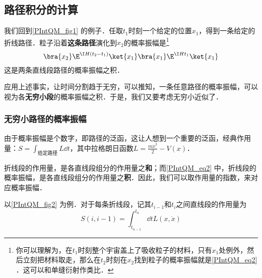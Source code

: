 \subsection{路径积分的计算}

我们回到\autoref{PIntQM_fig1} 的例子．任取$t_1$时刻一个给定的位置$x_1$，得到一条给定的折线路径．粒子沿着\textbf{这条路径}演化到$x_2$的概率振幅是\footnote{你可以理解为，在$t_1$时刻整个宇宙盖上了吸收粒子的材料，只有$x_1$处例外，然后立刻把材料取走，那么在$t_2$时刻在$x_2$找到粒子的概率振幅就是\autoref{PIntQM_eq2} ．这可以和单缝衍射作类比．}
\begin{equation}\label{PIntQM_eq2}
\bra{x_2}\E^{\I H (t_2-t_1)}\ket{x_1}\bra{x_1}\E^{\I H t_1}\ket{x_1}
\end{equation}
这是两条直线段路径的概率振幅之积．

应用上述事实，让时间分割趋于无穷，可以推知，一条任意路径的概率振幅，可以视为各\textbf{无穷小段}的概率振幅之积．于是，我们又要考虑无穷小近似了．

\subsubsection{无穷小路径的概率振幅}

由于概率振幅是个数字，即路径的泛函，这让人想到一个重要的泛函，经典作用量：$S=\int_{\text{给定路径}}L\dd t$，其中拉格朗日函数$L=\frac{m\dot{x}^2}{2}-V(x)$．

折线段的作用量，是各直线段组分的作用量之\textbf{和}；而\autoref{PIntQM_eq2} 中，折线段的概率振幅，是各直线段组分的作用量之\textbf{积}．因此，我们可以取作用量的指数，来对应概率振幅．

以\autoref{PIntQM_fig2} 为例．对于每条折线段，记其$t_{i-1}$和$t_i$之间直线段的作用量为
\begin{equation}
S(i, i-1)=\int^{t_n}_{t_{n-1}}\dd t L(x, \dot{x})
\end{equation}











